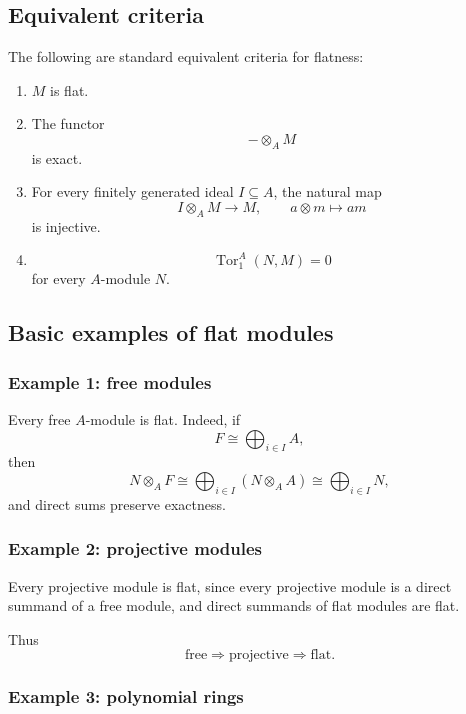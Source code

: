 \documentclass[12pt,a4paper]{article}
\theoremstyle{notespace}
\begin{document}
\subsection{Equivalent criteria}

The following are standard equivalent criteria for flatness:

\begin{enumerate}
	\item \(M\) is flat.
	
	\item The functor
	\[
	-\otimes_A M
	\]
	is exact.
	
	\item For every finitely generated ideal \(I\subseteq A\), the natural map
	\[
	I\otimes_A M \longrightarrow M,
	\qquad
	a\otimes m \mapsto am
	\]
	is injective.
	
	\item
	\[
	\operatorname{Tor}_1^A(N,M)=0
	\]
	for every \(A\)-module \(N\).
\end{enumerate}

\subsection{Basic examples of flat modules}

\subsubsection*{Example 1: free modules}

Every free \(A\)-module is flat. Indeed, if
\[
F\cong \bigoplus_{i\in I} A,
\]
then
\[
N\otimes_A F
\cong
\bigoplus_{i\in I}(N\otimes_A A)
\cong
\bigoplus_{i\in I} N,
\]
and direct sums preserve exactness.

\subsubsection*{Example 2: projective modules}

Every projective module is flat, since every projective module is a direct summand of a free module, and direct summands of flat modules are flat.

Thus
\[
\text{free} \Longrightarrow \text{projective} \Longrightarrow \text{flat}.
\]

\subsubsection*{Example 3: polynomial rings}
\end{document}
